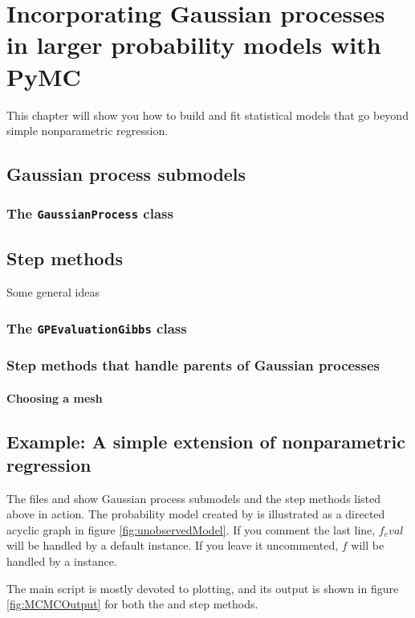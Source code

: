 \chapter{Incorporating Gaussian processes in larger probability models with PyMC}\label{cha:PyMC}
This chapter will show you how to build and fit statistical models that go beyond simple nonparametric regression.

\section{Gaussian process submodels}

\subsection{The \texttt{GaussianProcess} class} 

\section{Step methods}
Some general ideas
\subsection{The \texttt{GPEvaluationGibbs} class} 
\subsection{Step methods that handle parents of Gaussian processes}
\subsubsection{Choosing a mesh}  



\section{Example: A simple extension of nonparametric regression}\label{sub:BasicMCMC}
The files  and  show Gaussian process submodels and the step methods listed above in action. The probability model created by  is illustrated as a directed acyclic graph in figure \ref{fig:unobservedModel}. If you comment the last line, $f_eval$ will be handled by a default  instance. If you leave it uncommented, $f$ will be handled by a  instance.

The main script  is mostly devoted to plotting, and its output is shown in figure \ref{fig:MCMCOutput} for both the  and  step methods.

